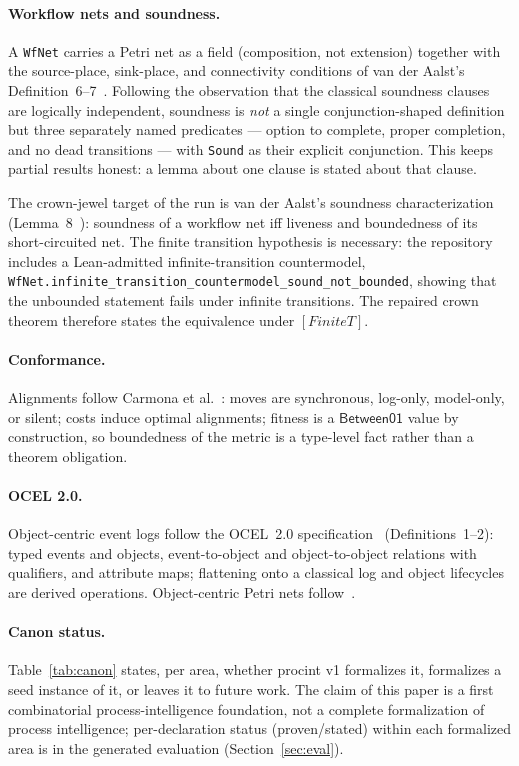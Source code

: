 \documentclass[11pt]{article}
\begin{document}
\paragraph{Workflow nets and soundness.}
A \texttt{WfNet} carries a Petri net as a field (composition, not
extension) together with the source-place, sink-place, and connectivity
conditions of van der Aalst's Definition~6--7~\cite{vanderaalst1997}.
Following the observation that the classical soundness clauses are logically
independent, soundness is \emph{not} a single conjunction-shaped definition
but three separately named predicates --- option to complete, proper
completion, and no dead transitions --- with \texttt{Sound} as their
explicit conjunction. This keeps partial results honest: a lemma about one
clause is stated about that clause.

The crown-jewel target of the run is van der Aalst's soundness
characterization (Lemma~8~\cite{vanderaalst1997}): soundness of a workflow net
iff liveness and boundedness of its short-circuited net. The finite transition
hypothesis is necessary: the repository includes a Lean-admitted
infinite-transition countermodel, \verb|WfNet.infinite_transition_countermodel_sound_not_bounded|,
showing that the unbounded statement fails under infinite transitions. The
repaired crown theorem therefore states the equivalence under \([Finite T]\).

\paragraph{Conformance.}
Alignments follow Carmona et al.~\cite{carmona2018}: moves are synchronous,
log-only, model-only, or silent; costs induce optimal alignments; fitness is
a \(\mathsf{Between01}\) value by construction, so boundedness of the metric
is a type-level fact rather than a theorem obligation.

\paragraph{OCEL 2.0.}
Object-centric event logs follow the OCEL~2.0
specification~\cite{ocel2} (Definitions~1--2): typed events and objects,
event-to-object and object-to-object relations with qualifiers, and
attribute maps; flattening onto a classical log and object lifecycles are
derived operations. Object-centric Petri nets follow~\cite{ocpn2020}.

\paragraph{Canon status.} Table~\ref{tab:canon} states, per area, whether
\textsf{procint} v1 formalizes it, formalizes a seed instance of it, or
leaves it to future work. The claim of this paper is a first combinatorial
process-intelligence foundation, not a complete formalization of process
intelligence; per-declaration status (proven/stated) within each formalized
area is in the generated evaluation (Section~\ref{sec:eval}).
\end{document}
